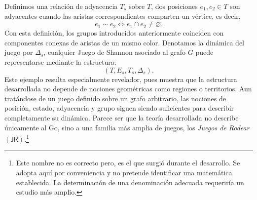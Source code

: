 	Definimos una relación de adyacencia $T_s$ sobre $T$, dos posiciones $e_1,e_2\in T$ son adyacentes cuando las aristas correspondientes comparten un vértice, es decir,
	$$	e_1\sim e_2	\iff e_1\cap e_2\neq\varnothing.$$
	Con esta definición, los grupos introducidos anteriormente coinciden con componentes conexas de aristas de un mismo color. Denotamos la dinámica del juego por $\Delta_s$, cualquier Juego de Shannon asociado al grafo $G$ puede representarse mediante la estructura:
	$$(T,E_s,T_s,\Delta_s).$$
	Este ejemplo resulta especialmente revelador, pues muestra que la estructura desarrollada no depende de nociones geométricas como regiones o territorios. Aun tratándose de un juego definido sobre un grafo arbitrario, las nociones de posición, estado, adyacencia y grupo siguen siendo suficientes para describir completamente su dinámica. Parece ser que la teoría desarrollada no describe únicamente al Go, sino a una familia más amplia de juegos, los \emph{Juegos de Rodear} $(\mathsf{JR})$.\footnote{Este nombre no es correcto pero, es el que surgió durante el desarrollo. Se adopta aquí por conveniencia y no pretende identificar una matemática establecida. La determinación de una denominación adecuada requeriría un estudio más amplio.}
